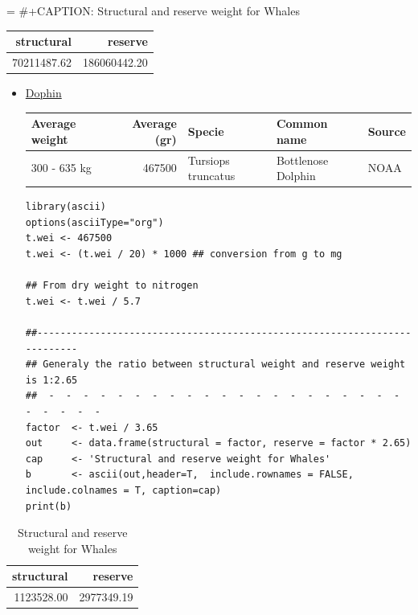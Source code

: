 \documentclass[11pt]{article}
\begin{document}
\begin{itemize}
=          \#+CAPTION: Structural and reserve weight for Whales

\begin{center}
\begin{tabular}{rr}
  structural  &       reserve  \\
\hline
 70211487.62  &  186060442.20  \\
\end{tabular}
\end{center}



\begin{itemize}
\item \underline{Dophin}

\begin{center}
\begin{tabular}{lrlll}
 Average weight  &  Average (gr)  &  Specie              &  Common name         &  Source  \\
\hline
 300 - 635 kg    &        467500  &  Tursiops truncatus  &  Bottlenose Dolphin  &  NOAA    \\
\end{tabular}
\end{center}



\begin{verbatim}
library(ascii)
options(asciiType="org")
t.wei <- 467500
t.wei <- (t.wei / 20) * 1000 ## conversion from g to mg

## From dry weight to nitrogen
t.wei <- t.wei / 5.7

##--------------------------------------------------------------------------
## Generaly the ratio between structural weight and reserve weight is 1:2.65
##  -  -  -  -  -  -  -  -  -  -  -  -  -  -  -  -  -  -  -  -  -  -  -  -  -  -
factor  <- t.wei / 3.65
out     <- data.frame(structural = factor, reserve = factor * 2.65)
cap     <- 'Structural and reserve weight for Whales'
b       <- ascii(out,header=T,  include.rownames = FALSE, include.colnames = T, caption=cap)
print(b)
\end{verbatim}
\end{itemize}
\begin{table}[htb]
\caption{Structural and reserve weight for Whales}
\begin{center}
\begin{tabular}{rr}
 structural  &     reserve  \\
\hline
 1123528.00  &  2977349.19  \\
\end{tabular}
\end{center}
\end{table}



\end{itemize}
\end{document}
